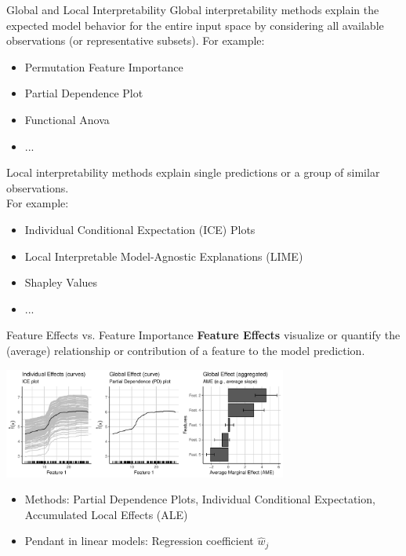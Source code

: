 \documentclass[aspectratio=169]{../latex_main/tntbeamer}  %
\begin{document}
\begin{frame}[c]{Global and Local Interpretability}
	Global interpretability methods explain the expected model behavior for the entire input space by considering all available observations (or representative subsets). For example:
	\begin{itemize}
		\item Permutation Feature Importance
		\item Partial Dependence Plot
		\item Functional Anova
		\item ...
	\end{itemize}
	\pause
	Local interpretability methods explain single predictions or a group of similar observations.\\ For example:
	\begin{itemize}
		\item Individual Conditional Expectation (ICE) Plots
		\item Local Interpretable Model-Agnostic Explanations (LIME)
		\item Shapley Values
		\item ...
	\end{itemize}
\end{frame}

\begin{frame}[c]{Feature Effects vs. Feature Importance}
	\vspace{-1em}
	\textbf{Feature Effects} visualize or quantify the (average) relationship or contribution of a feature to the model prediction.
	\begin{center}
		\includegraphics[page=1, width=0.7\textwidth]{figure/feature-effects}
	\end{center}
	\begin{itemize}
		\item Methods: Partial Dependence Plots, Individual Conditional Expectation,\\ Accumulated Local Effects (ALE)
		\item Pendant in linear models: Regression coefficient $\hat{w}_j$
	\end{itemize}
\end{frame}
\end{document}
